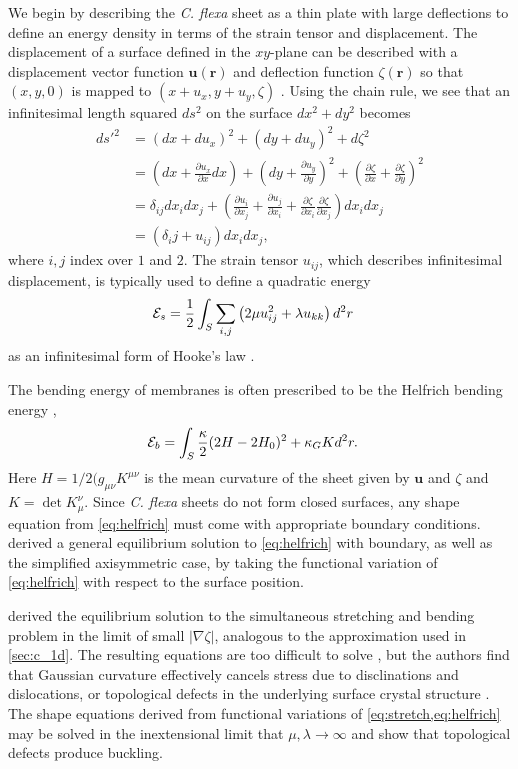 We begin by describing the \textit{C. flexa} sheet as a thin plate with large deflections to define an energy density in terms of the strain tensor and displacement.
The displacement of a surface defined in the $xy$-plane can be described with a displacement vector function $\bm{u}(\bm{r})$ and deflection function $\zeta(\bm{r})$ so that $(x, y, 0)$ is mapped to $(x + u_x, y + u_y, \zeta)$ \citep{landau1986}.
Using the chain rule, we see that an infinitesimal length squared $ds^2$ on the surface $dx^2 + dy^2$ becomes 
\begin{align*}
	d{s'}^2 &= (dx + du_x)^2 + (dy + du_y)^2 + d\zeta^2 \\
	&= \left(dx + \frac{\partial u_x}{\partial x} dx\right)+ \left(dy + \frac{\partial u_y}{\partial y} \right)^2 + \left(\frac{\partial\zeta}{\partial x} + \frac{\partial\zeta}{\partial y} \right)^2 \\
	&= \delta_{ij} dx_i dx_j + \left(\frac{\partial u_i}{\partial x_j} + \frac{\partial u_j}{\partial x_i} + \frac{\partial \zeta}{\partial x_i} \frac{\partial \zeta}{\partial x_j}\right) dx_i dx_j \\
	&= (\delta_ij + u_{ij}) dx_i dx_j,
\end{align*}
where $i,j$ index over $1$ and $2$. The strain tensor $u_{ij}$, which describes infinitesimal displacement, is typically used to define a quadratic energy 
\begin{align}
	\mathcal{E}_s &= \frac{1}{2} \int_S \sum_{i,j}\left( 2\mu u_{ij}^2 + \lambda u_{kk} \right) d^2r \label{eq:stretch}
\end{align}
as an infinitesimal form of Hooke's law \citep{landau1986}. 

The bending energy of membranes is often prescribed to be the Helfrich bending energy \citep{helfrich1973},
\begin{align}
	\mathcal{E}_b &= \int_S \frac{\kappa}{2} (2H - 2H_0)^2 + \kappa_G K d^2r. \label{eq:helfrich}	
\end{align}
\noindent Here $H=1/2 (g_{\mu\nu}K^{\mu\nu}$ is the mean curvature of the sheet given by $\bm{u}$ and $\zeta$ and $K = \det K_\mu^\nu$. 
Since \textit{C. flexa} sheets do not form closed surfaces, any shape equation from \cref{eq:helfrich} must come with appropriate boundary conditions. 
\citet{tu2003} derived a general equilibrium solution to \cref{eq:helfrich} with boundary, as well as the simplified axisymmetric case, by taking the functional variation of \cref{eq:helfrich} with respect to the surface position.

\citet{seung1988} derived the equilibrium solution to the simultaneous stretching and bending problem in the limit of small $|\nabla \zeta|$, analogous to the approximation used in \cref{sec:c_1d}.
The resulting equations are too difficult to solve \citep{landau1986}, but the authors find that Gaussian curvature effectively cancels stress due to disclinations and dislocations, or topological defects in the underlying surface crystal structure \citep{sachdev1984}.
The shape equations derived from functional variations of \cref{eq:stretch,eq:helfrich} may be solved in the inextensional limit that $\mu,\lambda \to\infty$ and show that topological defects produce buckling.

